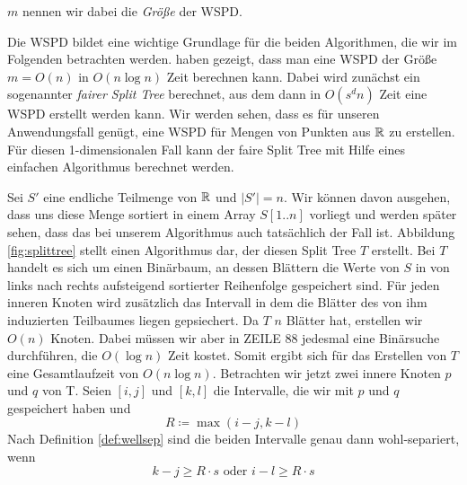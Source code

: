 	\noindent $m$ nennen wir dabei die \emph{Größe} der WSPD.

	Die WSPD bildet eine wichtige Grundlage für die beiden Algorithmen, die wir im Folgenden betrachten werden. 
	\textellipsis haben gezeigt, dass man eine WSPD der Größe $m = O(n)$ in $O(n\log n)$ Zeit berechnen kann. 
	Dabei wird zunächst ein sogenannter \emph{fairer Split Tree} berechnet, aus dem dann in $O(s^dn)$ Zeit eine WSPD erstellt werden kann. 
	Wir werden sehen, dass es für unseren Anwendungsfall genügt, eine WSPD für Mengen von Punkten aus $\mathbb{R}$ zu erstellen. 
	Für diesen 1-dimensionalen Fall kann der faire Split Tree mit Hilfe eines einfachen Algorithmus berechnet werden.
	
	
	
	Sei $S'$ eine endliche Teilmenge von $\mathbb{R}$ und $|S'| = n$. Wir können davon ausgehen, dass uns diese Menge sortiert in einem Array $S[1..n]$ vorliegt und werden später sehen, dass das bei unserem Algorithmus auch tatsächlich der Fall ist. Abbildung \ref{fig:splittree} stellt einen Algorithmus dar, der diesen Split Tree $T$ erstellt. Bei $T$ handelt es sich um einen Binärbaum, an dessen Blättern die Werte von $S$ in von links nach rechts aufsteigend sortierter Reihenfolge gespeichert sind. Für jeden inneren Knoten wird zusätzlich das Intervall in dem die Blätter des von ihm induzierten Teilbaumes liegen gepsiechert.
	Da $T$ $n$ Blätter hat, erstellen wir $O(n)$ Knoten. Dabei müssen wir aber in ZEILE 88 jedesmal eine Binärsuche durchführen, die $O(\log n)$ Zeit kostet. Somit ergibt sich für das Erstellen von $T$ eine Gesamtlaufzeit von $O(n\log n)$.
	Betrachten wir jetzt zwei innere Knoten $p$ und $q$ von T. Seien $[i, j]$ und $[k, l]$ die Intervalle, die wir mit $p$ und $q$ gespeichert haben und 
	\[R \coloneqq \max(i - j, k - l)\]
	Nach Definition \ref{def:wellsep} sind die beiden Intervalle genau dann wohl-separiert, wenn 
	\[k - j \geq R \cdot s \text{ oder } i - l \geq R \cdot s \]
	
	
	
